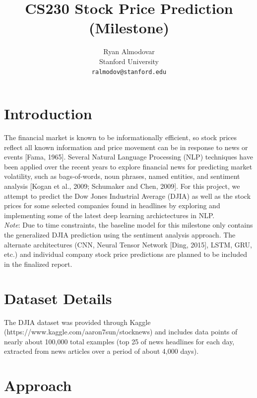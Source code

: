 \documentclass{article} %
\title{CS230 Stock Price Prediction (Milestone)}
\author{
Ryan Almodovar \\
Stanford University\\
\texttt{ralmodov@stanford.edu} \\
}
\begin{document}
\maketitle


\section{Introduction}
The financial market is known to be informationally efficient, so stock prices reflect all known
information and price movement can be in response to news or events [Fama, 1965].  
Several Natural Language Processing (NLP) techniques have been applied over the recent years to explore financial news for predicting market volatility,
such as bags-of-words, noun phrases, named entities, and sentiment analysis [Kogan et al., 2009; Schumaker and Chen, 2009].
For this project, we attempt to predict the Dow Jones Industrial Average (DJIA) as well as the stock prices for some selected companies found in headlines by exploring and implementing some of the latest deep learning archictectures in NLP.
\\
\textit{Note}: Due to time constraints, the baseline model for this milestone only contains the generalized DJIA prediction using the sentiment analysis approach.
The alternate architectures (CNN, Neural Tensor Network [Ding, 2015], LSTM, GRU, etc.)
and individual company stock price predictions are planned to be included in the finalized report.


\section{Dataset Details}

The DJIA dataset was provided through Kaggle (https://www.kaggle.com/aaron7sun/stocknews) and includes data points of nearly
about 100,000 total examples (top 25 of news headlines for each day, extracted from news articles over a period of about 4,000 days).


\section{Approach}
\end{document}
